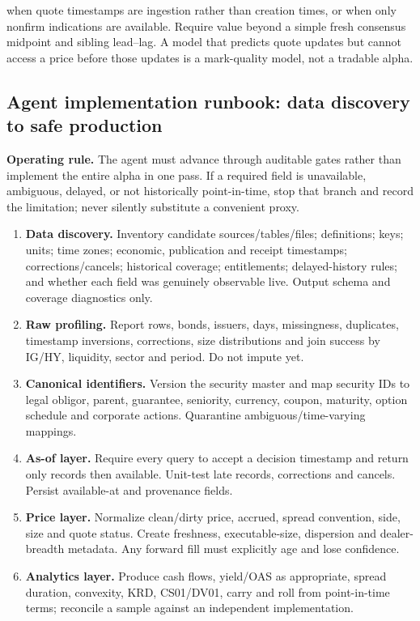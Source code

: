 \documentclass[10pt]{article}
\begin{document}
when quote timestamps are ingestion rather than creation times, or when only nonfirm indications are available. Require value beyond a simple fresh consensus midpoint and sibling lead--lag. A model that predicts quote updates but cannot access a price before those updates is a mark-quality model, not a tradable alpha.
\subsection{Agent implementation runbook: data discovery to safe production}
\textbf{Operating rule.} The agent must advance through auditable gates rather than implement the entire alpha in one pass. If a required field is unavailable, ambiguous, delayed, or not historically point-in-time, stop that branch and record the limitation; never silently substitute a convenient proxy.
\begin{enumerate}[leftmargin=2em,label=\textbf{A\arabic*.}]
\item \textbf{Data discovery.} Inventory candidate sources/tables/files; definitions; keys; units; time zones; economic, publication and receipt timestamps; corrections/cancels; historical coverage; entitlements; delayed-history rules; and whether each field was genuinely observable live. Output schema and coverage diagnostics only.
\item \textbf{Raw profiling.} Report rows, bonds, issuers, days, missingness, duplicates, timestamp inversions, corrections, size distributions and join success by IG/HY, liquidity, sector and period. Do not impute yet.
\item \textbf{Canonical identifiers.} Version the security master and map security IDs to legal obligor, parent, guarantee, seniority, currency, coupon, maturity, option schedule and corporate actions. Quarantine ambiguous/time-varying mappings.
\item \textbf{As-of layer.} Require every query to accept a decision timestamp and return only records then available. Unit-test late records, corrections and cancels. Persist available-at and provenance fields.
\item \textbf{Price layer.} Normalize clean/dirty price, accrued, spread convention, side, size and quote status. Create freshness, executable-size, dispersion and dealer-breadth metadata. Any forward fill must explicitly age and lose confidence.
\item \textbf{Analytics layer.} Produce cash flows, yield/OAS as appropriate, spread duration, convexity, KRD, CS01/DV01, carry and roll from point-in-time terms; reconcile a sample against an independent implementation.

\end{enumerate}
\end{document}
